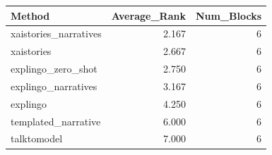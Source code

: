 \begin{tabular}{lrr}
\toprule
Method & Average_Rank & Num_Blocks \\
\midrule
xaistories_narratives & 2.167 & 6 \\
xaistories & 2.667 & 6 \\
explingo_zero_shot & 2.750 & 6 \\
explingo_narratives & 3.167 & 6 \\
explingo & 4.250 & 6 \\
templated_narrative & 6.000 & 6 \\
talktomodel & 7.000 & 6 \\
\bottomrule
\end{tabular}

